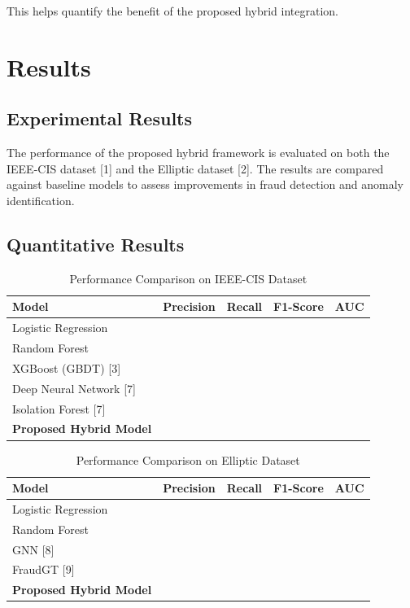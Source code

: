 \documentclass[conference]{IEEEtran}
\begin{document}
This helps quantify the benefit of the proposed hybrid integration.


\section{Results}

\subsection{Experimental Results}

The performance of the proposed hybrid framework is evaluated on both the IEEE-CIS dataset [1] and the Elliptic dataset [2]. The results are compared against baseline models to assess improvements in fraud detection and anomaly identification.

\subsection{Quantitative Results}

\begin{table}[h]
\centering
\caption{Performance Comparison on IEEE-CIS Dataset}
\begin{tabular}{lcccc}
\hline
Model & Precision & Recall & F1-Score & AUC \\
\hline
Logistic Regression &  &  &  &  \\
Random Forest &  &  &  &  \\
XGBoost (GBDT) [3] &  &  &  &  \\
Deep Neural Network [7] &  &  &  &  \\
Isolation Forest [7] &  &  &  &  \\
\textbf{Proposed Hybrid Model} &  &  &  &  \\
\hline
\end{tabular}
\end{table}

\begin{table}[h]
\centering
\caption{Performance Comparison on Elliptic Dataset}
\begin{tabular}{lcccc}
\hline
Model & Precision & Recall & F1-Score & AUC \\
\hline
Logistic Regression &  &  &  &  \\
Random Forest &  &  &  &  \\
GNN [8] &  &  &  &  \\
FraudGT [9] &  &  &  &  \\
\textbf{Proposed Hybrid Model} &  &  &  &  \\
\hline
\end{tabular}
\end{table}
\end{document}
